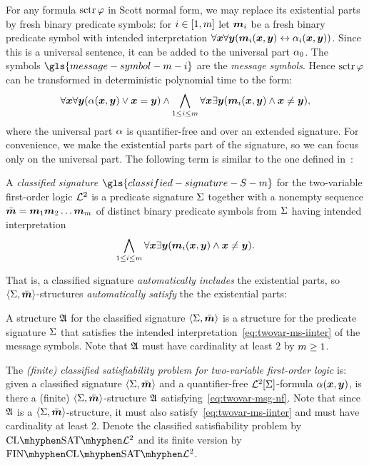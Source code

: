 For any formula $\operatorname{sctr}\varphi$ in Scott normal form, we may replace its
existential parts by fresh binary predicate symbols:
for $i \in [1,m]$ let $\bm{m}_{i}$ be a fresh binary predicate symbol with
intended interpretation
$\forall\bm{x}\forall\bm{y} (\bm{m}_{i}(\bm{x},\bm{y}) \leftrightarrow \alpha_{i}(\bm{x},\bm{y}))$.
Since this is a universal sentence, it can be added to the universal part
$\alpha_{0}$.
The symbols $\gls{message-symbol-m-i}$ are the \emph{message symbols}.
Hence $\operatorname{sctr}\varphi$ can be transformed in deterministic polynomial time to the
form:
\begin{equation}\label{eq:twovar-msg-nf}
  \forall\xx\forall\yy (\falp(\xx,\yy) \lor \xx = \yy) \land
  \bigwedge_{1 \leq \ii \leq \nm} \forall\xx\exists\yy
  (\smm\ii(\xx,\yy) \land \xx \neq \yy),
\end{equation}
where the universal part $\alpha$ is quantifier-free and over an extended
signature.
For convenience, we make the existential parts part of the signature, so we can
focus only on the universal part.
The following term is similar to the one defined in~\cite{MALQ:MALQ201400102}:
\begin{definition}
A \emph{classified signature} $\gls{classified-signature-S-m}$ for the
two-variable first-order logic $\mathcal{L}^{2}$ is a predicate signature $\mathrm{\Sigma}$ together
with a nonempty sequence $\sms = \smm1\smm2\dots\smm\nm$ of distinct binary
predicate symbols from $\mathrm{\Sigma}$ having intended interpretation
\begin{equation}\label{eq:twovar-ms-iinter}
  \bigwedge_{1 \leq \ii \leq \nm} \forall\xx\exists\yy 
  (\smm\ii(\xx,\yy) \land \xx \neq \yy).
\end{equation}
\end{definition}
That is, a classified signature \emph{automatically includes} the
existential parts, so $\left\langle \mathrm{\Sigma},\bar{\bm{m}} \right\rangle$-structures \emph{automatically satisfy}
the the existential parts:
\begin{definition}
A structure $\mathfrak{A}$ for the classified signature $\left\langle \mathrm{\Sigma},\bar{\bm{m}} \right\rangle$ is a
structure for the predicate signature $\mathrm{\Sigma}$ that satisfies the intended
interpretation~\cref{eq:twovar-ms-iinter} of the message symbols.
Note that $\mathfrak{A}$ must have cardinality at least $2$ by $m \geq 1$.
\end{definition}

\begin{definition}\label{def:clsig-twovar}
The \emph{(finite) classified satisfiability problem for two-variable
first-order logic} is:
given a classified signature $\left\langle \mathrm{\Sigma},\bar{\bm{m}} \right\rangle$ and a quantifier-free
$\mathcal{L}^{2}[\mathrm{\Sigma}]$-formula $\alpha(\bm{x},\bm{y})$, is there a (finite)
$\left\langle \mathrm{\Sigma},\bar{\bm{m}} \right\rangle$-structure $\mathfrak{A}$ satisfying~\cref{eq:twovar-msg-nf}.
Note that since $\mathfrak{A}$ is a $\left\langle \mathrm{\Sigma},\bar{\bm{m}} \right\rangle$-structure, it must also
satisfy~\cref{eq:twovar-ms-iinter} and must have cardinality at least $2$.
Denote the classified satisfiability problem by $\ClSat{\vFo2}$ and its finite
version by $\FinClSat{\vFo2}$.
\end{definition}

